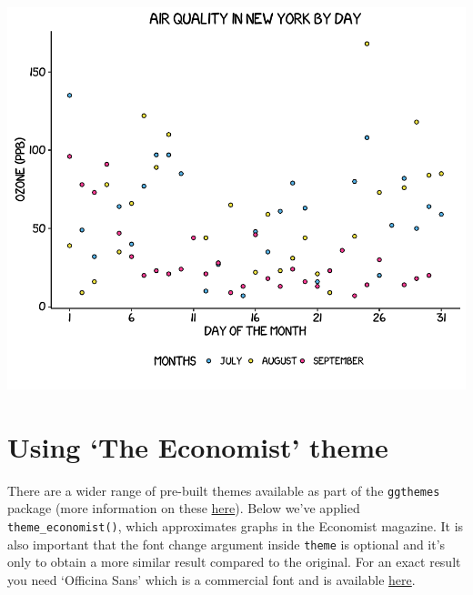 \begin{center}\includegraphics[width=0.6\linewidth]{5_Scatter_Plots_pdf/scatter_13-1} \end{center}

\section{\texorpdfstring{Using `The Economist'
theme}{Using The Economist theme}}\label{using-the-economist-theme}

There are a wider range of pre-built themes available as part of the
\texttt{ggthemes} package (more information on these
\href{https://cran.r-project.org/web/packages/ggthemes/vignettes/ggthemes.html}{here}).
Below we've applied \texttt{theme\_economist()}, which approximates
graphs in the Economist magazine. It is also important that the font
change argument inside \texttt{theme} is optional and it's only to
obtain a more similar result compared to the original. For an exact
result you need `Officina Sans' which is a commercial font and is
available \href{http://www.myfonts.com/fonts/itc/officina-sans/}{here}.

